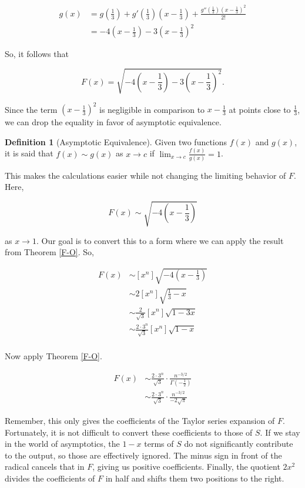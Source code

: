 \documentclass[11pt]{amsart}
\theoremstyle{plain}%
\theoremstyle{definition}
\newtheorem{defin}[thm]{{Definition}}
\theoremstyle{remark}
\numberwithin{equation}{thm}
\begin{document}
\begin{align*}
    g(x) &= g\left(\frac{1}{3}\right) + g'\left(\frac{1}{3}\right)\left(x-\frac{1}{3}\right) + \frac{g''\left(\frac{1}{3}\right)\left(x-\frac{1}{3}\right)^2}{2!}\\
    &= -4\left(x-\frac{1}{3}\right) - 3\left(x-\frac{1}{3}\right)^2
\end{align*}

So, it follows that

$$F(x) = \sqrt{-4\left(x-\frac{1}{3}\right) - 3\left(x-\frac{1}{3}\right)^2}.$$

Since the term $\left(x-\frac{1}{3}\right)^2$ is negligible in comparison to $x-\frac{1}{3}$ at points close to $\frac{1}{3}$, we can drop the equality in favor of asymptotic equivalence.

\begin{defin}[Asymptotic Equivalence]
Given two functions $f(x)$ and $g(x)$, it is said that $f(x) \sim g(x)$ as $x \to c$ if $\lim_{x \to c} \frac{f(x)}{g(x)} = 1$.
\end{defin}

This makes the calculations easier while not changing the limiting behavior of $F$. Here,

$$F(x) \sim \sqrt{-4\left(x-\frac{1}{3}\right)}$$

\noindent as $x \to 1$. Our goal is to convert this to a form where we can apply the result from Theorem \ref{F-O}. So,

\begin{align*}
    [x^n]F(x) &\sim [x^n]\sqrt{-4\left(x-\frac{1}{3}\right)}\\
    &\sim 2[x^n]\sqrt{\frac{1}{3} - x}\\
    &\sim \frac{2}{\sqrt{3}} [x^n]\sqrt{1-3x}\\
    &\sim \frac{2 \cdot 3^n}{\sqrt{3}} [x^n]\sqrt{1-x}\\
\end{align*}

Now apply Theorem \ref{F-O}.

\begin{align*}
    [x^n]F(x) &\sim \frac{2 \cdot 3^n}{\sqrt{3}} \cdot \frac{n^{-3/2}}{\Gamma (-\frac{1}{2})}\\
    &\sim \frac{2 \cdot 3^n}{\sqrt{3}} \cdot \frac{n^{-3/2}}{-2\sqrt{\pi}}
\end{align*}

Remember, this only gives the coefficients of the Taylor series expansion of $F$. Fortunately, it is not difficult to convert these coefficients to those of $S$. If we stay in the world of asymptotics, the $1-x$ terms of $S$ do not significantly contribute to the output, so those are effectively ignored. The minus sign in front of the radical cancels that in $F$, giving us positive coefficients. Finally, the quotient $2x^2$ divides the coefficients of $F$ in half and shifts them two positions to the right.
\end{document}
